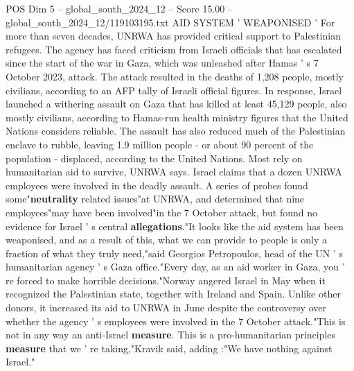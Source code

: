 \begin{textsample}{POS Dim 5 – global\_south\_2024\_12 – Score 15.00 – global\_south\_2024\_12/119103195.txt}
AID SYSTEM ' WEAPONISED ' For more than seven decades, UNRWA has provided critical support to Palestinian refugees.
The agency has faced criticism from Israeli officials that has escalated since the start of the war in Gaza, which was unleashed after Hamas ' s 7 October 2023, attack.
The attack resulted in the deaths of 1,208 people, mostly civilians, according to an AFP tally of Israeli official figures.
In response, Israel launched a withering assault on Gaza that has killed at least 45,129 people, also mostly civilians, according to Hamas-run health ministry figures that the United Nations considers reliable.
The assault has also reduced much of the Palestinian enclave to rubble, leaving 1.9 million people - or about 90 percent of the population - displaced, according to the United Nations.
Most rely on humanitarian aid to survive, UNRWA says.
Israel claims that a dozen UNRWA employees were involved in the deadly assault.
A series of probes found some"\textbf{neutrality} related issues"at UNRWA, and determined that nine employees"may have been involved"in the 7 October attack, but found no evidence for Israel ' s central \textbf{allegations}."It looks like the aid system has been weaponised, and as a result of this, what we can provide to people is only a fraction of what they truly need,"said Georgios Petropoulos, head of the UN ' s humanitarian agency ' s Gaza office."Every day, as an aid worker in Gaza, you ' re forced to make horrible decisions."Norway angered Israel in May when it recognized the Palestinian state, together with Ireland and Spain.
Unlike other donors, it increased its aid to UNRWA in June despite the controversy over whether the agency ' s employees were involved in the 7 October attack."This is not in any way an anti-Israel \textbf{measure}.
This is a pro-humanitarian principles \textbf{measure} that we ' re taking,"Kravik said, adding :"We have nothing against Israel."

\end{textsample}
